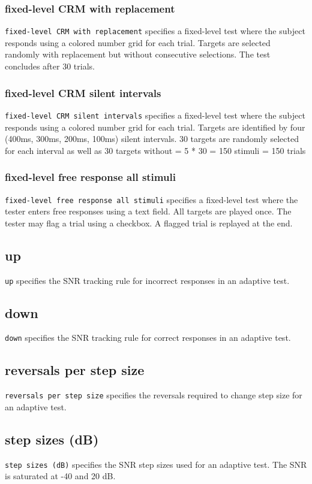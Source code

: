 \documentclass[11pt,pdftex,letterpaper]{article}
\begin{document}
\subsubsection{fixed-level CRM with replacement}
\texttt{fixed-level CRM with replacement} specifies a fixed-level test where the subject responds using a colored number grid for each trial. Targets are selected randomly with replacement but without consecutive selections. The test concludes after 30 trials.
\subsubsection{fixed-level CRM silent intervals}
\texttt{fixed-level CRM silent intervals} specifies a fixed-level test where the subject responds using a colored number grid for each trial. Targets are identified by four (400ms, 300ms, 200ms, 100ms) silent intervals. 30 targets are randomly selected for each interval as well as 30 targets without = 5 * 30 = 150 stimuli = 150 trials
\subsubsection{fixed-level free response all stimuli}
\texttt{fixed-level free response all stimuli} specifies a fixed-level test where the tester enters free responses using a text field. All targets are played once. The tester may flag a trial using a checkbox. A flagged trial is replayed at the end.
\subsection{up}
\texttt{up} specifies the SNR tracking rule for incorrect responses in an adaptive test.
\subsection{down}
\texttt{down} specifies the SNR tracking rule for correct responses in an adaptive test.
\subsection{reversals per step size}
\texttt{reversals per step size} specifies the reversals required to change step size for an adaptive test.
\subsection{step sizes (dB)}
\texttt{step sizes (dB)} specifies the SNR step sizes used for an adaptive test. The SNR is saturated at -40 and 20 dB.
\end{document}
